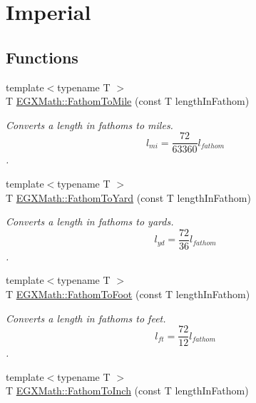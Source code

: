 \hypertarget{group___e_g_x_math-_conversions-_length_conversions-_imperial-_fathom-_imperial}{}\section{Imperial}
\label{group___e_g_x_math-_conversions-_length_conversions-_imperial-_fathom-_imperial}
\subsection*{Functions}
\begin{DoxyCompactItemize}
\item 
{\footnotesize template$<$typename T $>$ }\\T \mbox{\hyperlink{group___e_g_x_math-_conversions-_length_conversions-_imperial-_fathom-_imperial_ga4922ca5fe88bedc7aaa78d15e64a5534}{E\+G\+X\+Math\+::\+Fathom\+To\+Mile}} (const T length\+In\+Fathom)
\begin{DoxyCompactList}\small\item\em Converts a length in fathoms to miles. \[ l_{mi}=\frac{72}{63360} l_{fathom} \]. \end{DoxyCompactList}\item 
{\footnotesize template$<$typename T $>$ }\\T \mbox{\hyperlink{group___e_g_x_math-_conversions-_length_conversions-_imperial-_fathom-_imperial_ga1f8085825612168639f1db2cd20432cb}{E\+G\+X\+Math\+::\+Fathom\+To\+Yard}} (const T length\+In\+Fathom)
\begin{DoxyCompactList}\small\item\em Converts a length in fathoms to yards. \[ l_{yd}= \frac{72}{36} l_{fathom} \]. \end{DoxyCompactList}\item 
{\footnotesize template$<$typename T $>$ }\\T \mbox{\hyperlink{group___e_g_x_math-_conversions-_length_conversions-_imperial-_fathom-_imperial_ga71995f5dd30211dc6c7c601d26a5fec8}{E\+G\+X\+Math\+::\+Fathom\+To\+Foot}} (const T length\+In\+Fathom)
\begin{DoxyCompactList}\small\item\em Converts a length in fathoms to feet. \[ l_{ft}= \frac{72}{12} l_{fathom} \]. \end{DoxyCompactList}\item 
{\footnotesize template$<$typename T $>$ }\\T \mbox{\hyperlink{group___e_g_x_math-_conversions-_length_conversions-_imperial-_fathom-_imperial_ga92c156dbffb555541217b319e8cafb72}{E\+G\+X\+Math\+::\+Fathom\+To\+Inch}} (const T length\+In\+Fathom)

\end{DoxyCompactItemize}
